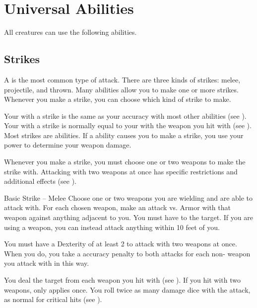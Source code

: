 \section{Universal Abilities}\label{Universal Abilities}
    All creatures can use the following abilities.

    \subsection{Strikes}\label{Strikes}
        A  is the most common type of attack.
        There are three kinds of strikes: melee, projectile, and thrown.
        Many abilities allow you to make one or more strikes.
        Whenever you make a strike, you can choose which kind of strike to make.

        Your  with a strike is the same as your accuracy with most other abilities (see ).
        Your  with a strike is normally equal to your  with the weapon you hit with (see ).
        Most strikes are  abilities.
        If a \magical ability causes you to make a strike, you use your \magical power to determine your weapon damage.

        Whenever you make a strike, you must choose one or two weapons to make the strike with.
        Attacking with two weapons at once has specific restrictions and additional effects (see ).

        \begin{activeability}{Basic Strike -- Melee}
            \label{Melee Strike}
            \rankline
            Choose one or two weapons you are wielding and are able to attack with.
            For each chosen weapon, make an attack vs. Armor with that weapon against anything adjacent to you.
            You must have  to the target.
            If you are using a  weapon, you can instead attack anything within 10 feet of you.

            You must have a Dexterity of at least 2 to attack with two weapons at once.
            When you do, you take a  accuracy penalty to both attacks for each non- weapon you attack with in this way.

            \hit You deal the target  from each weapon you hit with (see ).
            If you hit with two weapons,  only applies once.
            \crit You roll twice as many damage dice with the attack, as normal for critical hits (see ).
        \end{activeability}

